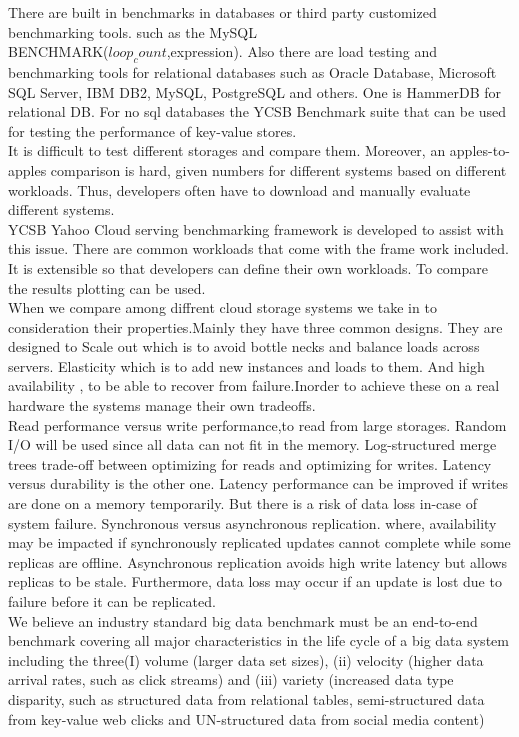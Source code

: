 \documentclass{bigdata}
\begin{document}
There are built in benchmarks in databases or third party customized benchmarking tools. such as the MySQL\\ BENCHMARK($loop_count$,expression). Also there are load testing and benchmarking tools for relational databases such as  Oracle Database, Microsoft SQL Server, IBM DB2,  MySQL, PostgreSQL and others. One is HammerDB for relational DB. For no sql databases the YCSB Benchmark suite that can be used for testing the performance of key-value stores. \\
It is difficult to test different storages and compare them. Moreover, an apples-to-apples comparison is hard, given numbers for different systems based on different workloads. Thus, developers often have to download and manually evaluate different systems. \cite{f}\\
YCSB Yahoo Cloud serving benchmarking framework is developed to assist with this issue.  There are common workloads that come with the frame work included. It is extensible so that developers can define their own workloads. To compare the results plotting can be used. \\
When we compare among diffrent cloud storage systems we take in to consideration their properties.Mainly they have three common designs. They are designed to Scale out which is  to avoid bottle necks and balance loads across servers.  Elasticity which is to add new instances and loads to them. And high availability , to be able to recover from failure.Inorder to achieve these on a real hardware the systems manage their own tradeoffs.\\
Read performance versus write performance,to read from large storages. Random I/O will be used since all data can not fit in the memory. Log-structured merge trees \cite{f} trade-off between optimizing for reads and optimizing for writes\cite{f}. Latency versus durability is the other one. Latency performance can be improved if writes are done on a memory temporarily. But there is a risk of data loss in-case of system failure. Synchronous versus asynchronous replication. where, availability may be impacted if synchronously replicated updates cannot complete while some replicas are
offline. Asynchronous replication avoids high write latency but allows replicas to be stale. Furthermore, data loss may
occur if an update is lost due to failure before it can be
replicated.\\
We believe an industry standard big data benchmark must be an end-to-end benchmark\cite{h} covering all major characteristics in the life cycle of a big data system including the three(I) volume (larger data set sizes), (ii) velocity (higher data arrival rates, such as click streams) and (iii) variety (increased data type disparity, such as structured data from relational tables, semi-structured data from key-value web clicks and UN-structured data from social media content)\cite{h}
\end{document}

